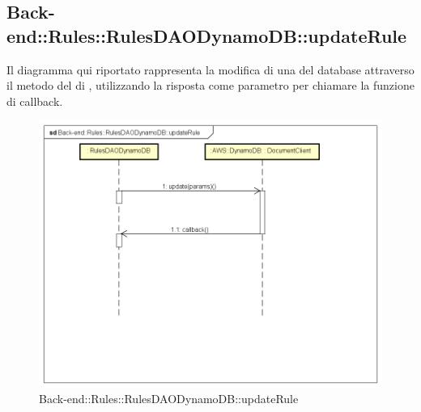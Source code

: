 \subsection{Back-end::Rules::RulesDAODynamoDB::updateRule}
Il diagramma qui riportato rappresenta la modifica di una  del database attraverso il metodo  del  di , utilizzando la risposta come parametro per chiamare la funzione di callback.
 \begin{figure}[h] \centering \includegraphics[width=\textwidth,height=\textheight,keepaspectratio]{images/diagrams/back-end/Ufficial_Backend/Back-endRulesRulesDAODynamoDBupdateRule.png} 	\caption{Back-end::Rules::RulesDAODynamoDB::updateRule}
\end{figure}
\newpage
